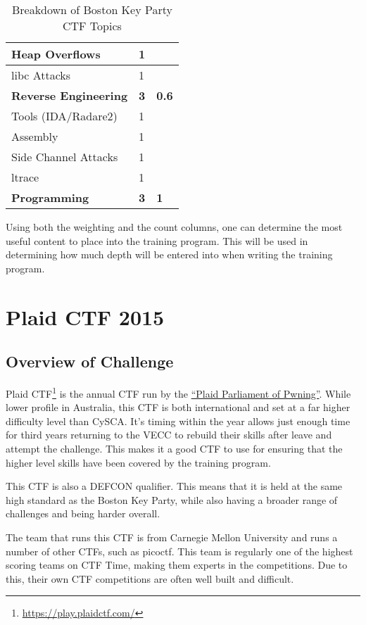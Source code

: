 \documentclass[a4paper,11pt]{report}
\begin{document}
\begin{table}[H]
\begin{tabular}{| l | l | l |}
				\quad Heap Overflows & 1 & \\ \hline 
				\quad libc Attacks & 1 & \\ \hline 
				\textbf{Reverse Engineering} & \textbf{3} & \textbf{0.6} \\ \hline
				\quad Tools (IDA/Radare2) & 1 & \\ \hline 
				\quad Assembly & 1 & \\ \hline 
				\quad Side Channel Attacks & 1 & \\ \hline 
				\quad ltrace & 1 & \\ \hline 
				\textbf{Programming} & \textbf{3} & \textbf{1}\\ \hline
			\end{tabular}
			\caption{Breakdown of Boston Key Party CTF Topics}
			\label{tab:BCTFBreakdown}
		\end{table}
		Using both the weighting and the count columns, one can determine the most useful content to place into the training program. 
		This will be used in determining how much depth will be entered into when writing the training program. 	
\chapter{Plaid CTF 2015}
	\section{Overview of Challenge}
		Plaid CTF\footnote{\url{https://play.plaidctf.com/}} is the annual CTF run by the \href{http://pwning.net/}{``Plaid Parliament of Pwning''}.
		While lower profile in Australia, this CTF is both international and set at a far higher difficulty level than CySCA. 
		It's timing within the year allows just enough time for third years returning to the VECC to rebuild their skills after leave and attempt the challenge. 
		This makes it a good CTF to use for ensuring that the higher level skills have been covered by the training program. 

		This CTF is also a DEFCON qualifier. 
		This means that it is held at the same high standard as the Boston Key Party, while also having a broader range of challenges and being harder overall. 

		The team that runs this CTF is from Carnegie Mellon University and runs a number of other CTFs, such as picoctf. 
		This team is regularly one of the highest scoring teams on CTF Time, making them experts in the competitions. 
		Due to this, their own CTF competitions are often well built and difficult. 
	
\end{document}
